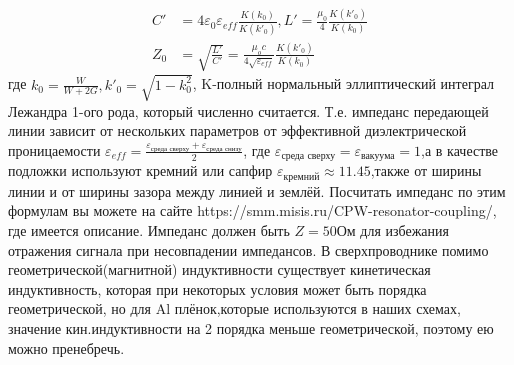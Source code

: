 \documentclass[12pt, a4paper, openany]{book}
\begin{document}
	\begin{align*}
	C'&=4\varepsilon_0\varepsilon_{eff}\frac{K(k_0)}{K(k'_0)},
	L'=\frac{\mu_0}{4}\frac{K(k'_0)}{K(k_0)}\\
	Z_0&=\sqrt{\frac{L'}{C'}}	=\frac{\mu_o c}{4\sqrt{\varepsilon_{eff}}}\frac{K(k'_0)}{K(k_0)}
	\end{align*}
где $k_0=\frac{W}{W+2G},k'_0=\sqrt{1-k_0^2}$, K-полный нормальный эллиптический интеграл Лежандра 1-ого рода, который численно считается.
Т.е. импеданс передающей линии зависит от нескольких параметров от эффективной диэлектрической проницаемости $\varepsilon_{eff}=\frac{\varepsilon_{\text{среда сверху}}+\varepsilon_{\text{среда снизу}}}{2}$, где $\varepsilon_{\text{среда сверху}}=\varepsilon_{\text{вакуума}}=1$,а в качестве подложки используют кремний или сапфир $\varepsilon_{\text{кремний}}\approx11.45$,также от ширины линии и от ширины зазора между линией и землёй. Посчитать импеданс по этим формулам вы можете на сайте https://smm.misis.ru/CPW-resonator-coupling/, где имеется описание. Импеданс должен быть $Z=50$Ом для избежания отражения сигнала при несовпадении импедансов. В сверхпроводнике помимо геометрической(магнитной) индуктивности существует кинетическая индуктивность\cite{Goppl2008}, которая при некоторых условия может быть порядка геометрической, но для Al плёнок,которые используются в наших схемах, значение кин.индуктивности на 2 порядка меньше геометрической, поэтому ею можно пренебречь.
\end{document}
